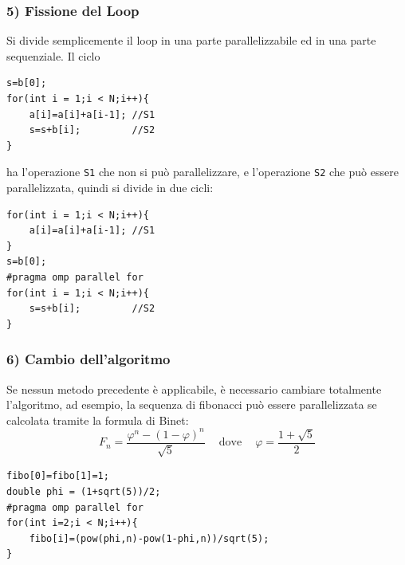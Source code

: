 \documentclass[10pt, letterpaper]{report}
\begin{document}
\subsubsection{5) Fissione del Loop} 
Si divide semplicemente il loop in una parte parallelizzabile ed in una parte sequenziale. Il ciclo
\begin{lstlisting}[style=CStyle]
s=b[0];
for(int i = 1;i < N;i++){
    a[i]=a[i]+a[i-1]; //S1
    s=s+b[i];         //S2
}
\end{lstlisting}
ha l'operazione \texttt{S1} che non si può parallelizzare, e l'operazione \texttt{S2} che può essere parallelizzata, quindi si divide in due cicli:
\begin{lstlisting}[style=CStyle]
for(int i = 1;i < N;i++){
    a[i]=a[i]+a[i-1]; //S1
}
s=b[0];
#pragma omp parallel for 
for(int i = 1;i < N;i++){
    s=s+b[i];         //S2
}
\end{lstlisting}
\subsubsection{6) Cambio dell'algoritmo}
Se nessun metodo precedente è applicabile, è necessario cambiare totalmente l'algoritmo, ad esempio, la sequenza di fibonacci può essere parallelizzata se calcolata tramite la formula di Binet: 
$$F_n=\frac{\varphi^n-(1-\varphi)^n}{\sqrt{5}} \ \ \ \  \text{ dove } \ \ \ \ \varphi=\frac{1+\sqrt{5}}{2}$$ 
\begin{lstlisting}[style=CStyle]
fibo[0]=fibo[1]=1;
double phi = (1+sqrt(5))/2;
#pragma omp parallel for 
for(int i=2;i < N;i++){
    fibo[i]=(pow(phi,n)-pow(1-phi,n))/sqrt(5);
}
\end{lstlisting}
\end{document}
